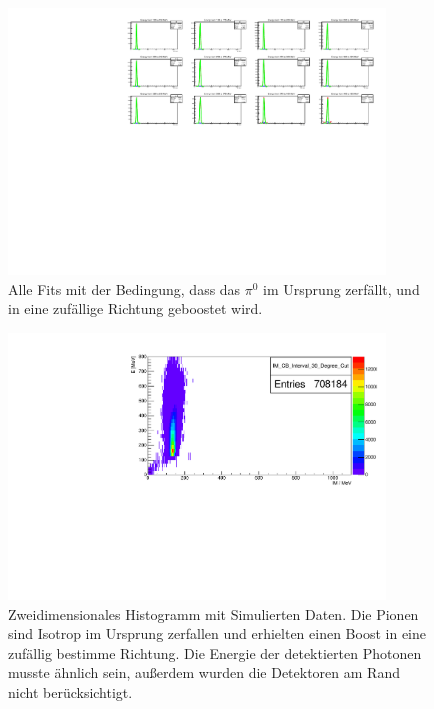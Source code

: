\documentclass[a4paper,11pt,oneside,final,german,openbib,pdftex]{scrbook}
\begin{document}
{\begin{appendix}
\begin{figure}[h!]
	\begin{center}
		\includegraphics[width=100mm]{NewCalib/UrsprungIsotrop/20171904SimIsotropUrsprungNoCutAllFits}
\caption{Alle Fits mit der Bedingung, dass das $\pi^0$ im Ursprung zerf\"allt, und in eine zuf\"allige Richtung geboostet wird. }
\label{fig:All-Fits-Isotrop-No-Cut}
\end{center}

\end{figure}

\begin{figure}[h!]
	\begin{center}
		\includegraphics[width=100mm]{NewCalib/UrsprungIsotrop/20171904SimUrsprungIsotrop30DegreeCutHist}
		\caption{Zweidimensionales Histogramm mit Simulierten Daten. Die Pionen sind Isotrop im Ursprung zerfallen und erhielten einen Boost in eine zuf\"allig bestimme Richtung. Die Energie der detektierten Photonen musste \"ahnlich sein, au{\ss}erdem wurden die Detektoren am Rand nicht ber\"ucksichtigt.}
		\label{fig:Sim-Data-Ursprung-2DHist-30-Degree-Edge}
	\end{center}
\end{figure}


\end{appendix}}
\end{document}
